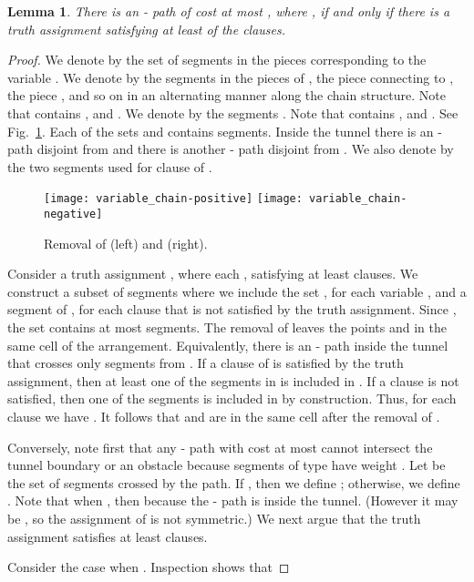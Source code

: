 \documentclass[11pt,a4paper]{article}
\newtheorem{lemma}[definition]{Lemma}
\begin{document}
\begin{lemma}\label{sec2_lem:bothdirections}
There is an - path of cost at most , where , if and only if 
there is a truth assignment satisfying at least  of the clauses.
\end{lemma}
\begin{proof}
We denote by  the set of segments in the pieces corresponding to the variable .
We denote by  the segments in the pieces of , the piece connecting  to , the piece  , and so on in an alternating manner along the chain structure. Note that  contains ,  and .
We denote by  the segments . Note that  contains ,  and .
See Fig.~\ref{chain-posneg}.
Each of the sets  and  contains  segments. Inside the tunnel there is an - path disjoint from  and there is another - path disjoint from . We also denote by  the two segments used for clause  of .

\begin{figure}
\centering
\hfill
\texttt{[image: variable\_chain-positive]}
\centering
\hfill
\texttt{[image: variable\_chain-negative]}
\hfill
\caption{Removal of  (left) and  (right).}
\label{chain-posneg}
\end{figure}

Consider a truth assignment , where each , satisfying at least  clauses. We construct a subset of segments  where we include the set , for each variable , and a segment of , for each clause  that is not satisfied by the truth assignment. Since , the set  contains at most  segments. The removal of  leaves the points  and  in the same cell of the arrangement. Equivalently, there is an - path inside the tunnel that crosses only segments from . If a clause  of  is satisfied by the truth assignment, then at least one of the segments in  is included in . If a clause  is not satisfied, then one of the segments  is included in  by construction. Thus, for each clause  we have . It follows that  and  are in the same cell after the removal of .

Conversely, note first that any - path with cost at most  cannot intersect the tunnel boundary or an obstacle because segments of type  have weight . Let  be the set of segments crossed by the path. If , then we define ; otherwise, we define .
Note that when , then  because the - path is inside the tunnel. (However it may be , so the assignment of  is not symmetric.) We next argue that the truth assignment  satisfies at least  clauses.

Consider the case when . Inspection shows that 


\end{proof}
\end{document}
